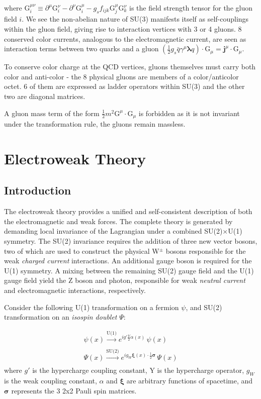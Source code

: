 where $\mathrm{G}^{\mu\nu}_{i} \equiv \partial^{\mu} \mathrm{G}^{\nu}_{i} - \partial^{\nu} \mathrm{G}^{\mu}_{i} - g_{s} f_{ijk} \mathrm{G}^{\mu}_{j} \mathrm{G}^{\nu}_{k}$ is the field strength tensor for the gluon field $i$. We see the non-abelian nature of SU(3) manifests itself as self-couplings within the gluon field, giving rise to interaction vertices with 3 or 4 gluons. 8 conserved color currents, analogous to the electromagnetic current, are seen as interaction terms between two quarks and a gluon $(\frac{1}{2} g_{s} \bar{q} \gamma^{\mu} \bm{\lambda} q) \cdot \bm{\mathrm{G}}_{\mu} = \bm{j}^{\mu} \cdot \bm{\mathrm{G}}_{\mu}$.

To conserve color charge at the QCD vertices, gluons themselves must carry both color and anti-color - the 8 physical gluons are members of a color/anticolor octet. 6 of them are expressed as ladder operators within SU(3) and the other two are diagonal matrices.

A gluon mass term of the form $\frac{1}{2}m^{2}\bm{\mathrm{G}}^{\mu} \cdot \bm{\mathrm{G}}_{\mu}$ is forbidden as it is not invariant under the transformation rule, the gluons remain massless.

\section{Electroweak Theory}

\subsection{Introduction}

The electroweak theory provides a unified and self-consistent description of both the electromagnetic and weak forces. The complete theory is generated by demanding local invariance of the Lagrangian under a combined SU(2)$\times$U(1) symmetry. The SU(2) invariance requires the addition of three new vector bosons, two of which are used to construct the physical W$^{\pm}$ bosons responsible for the weak \textit{charged current} interactions. An additional gauge boson is required for the U(1) symmetry. A mixing between the remaining SU(2) gauge field and the U(1) gauge field yield the Z boson and photon, responsible for weak \textit{neutral current} and electromagnetic interactions, respectively. 

Consider the following U(1) transformation on a fermion $\psi$, and SU(2) transformation on an \textit{isospin doublet} $\Psi$:

\begin{equation}
\begin{array}{l}
\psi(x) \xrightarrow[]{\text{U(1)}} e^{i g' \frac{Y}{2} \alpha(x)} \, \psi(x) \\
\Psi(x) \xrightarrow[]{\text{SU(2)}} e^{i g_{W} \bm{\xi}(x) \cdot \frac{1}{2} \bm{\sigma} } \, \Psi(x) 
\end{array}
\end{equation}
where $g'$ is the hypercharge coupling constant, Y is the hypercharge operator, $g_{W}$ is the weak coupling constant, $\alpha$ and $\bm{\xi}$ are arbitrary functions of spacetime, and $\bm{\sigma}$ represents the 3 2x2 Pauli spin matrices.

